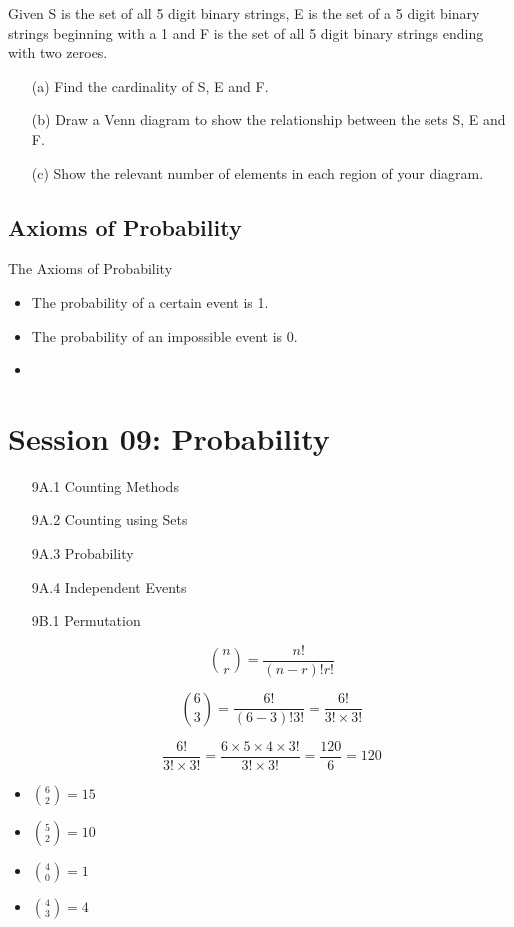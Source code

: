 \documentclass[]{report}
\begin{document}
Given S is the set of all 5 digit binary strings, E is the set of a 5 digit
binary strings beginning with a 1 and F is the set of all 5 digit binary strings ending
with two zeroes.
\begin{itemize}
	\item[(a)] Find the cardinality of S, E and F.
	\item[(b)] Draw a Venn diagram to show the relationship between the sets S, E and F.
	\item[(c)]Show the relevant number of elements in each region of your diagram.
\end{itemize}
\newpage




\subsection{Axioms of Probability}

The Axioms of Probability

\begin{itemize}
	\item The probability of a certain event is 1.
	\item The probability of an impossible event is 0.
	\item 
\end{itemize}
				\section*{Session 09: Probability}
				\begin{itemize}
					\item[9A.1] Counting Methods
					\item[9A.2] Counting using Sets
					\item[9A.3] Probability
					\item[9A.4] Independent Events
				\end{itemize}
				\begin{itemize}
					\item[9B.1] Permutation
					
					\[ {n \choose r} = \frac{n!}{(n-r)! r!} \]
					
					
					\[ {6 \choose 3} = \frac{6!}{(6-3)! 3!} = \frac{6!}{3! \times 3!}\]
					
					
					\[ \frac{6!}{3! \times 3!} = \frac{6 \times 5 \times 4 \times 3!}{3! \times 3!} = \frac{120}{6} = 120\]
				\end{itemize}
				\begin{itemize}
					\item ${6 \choose 2} = 15$
					\item ${5 \choose 2} = 10$  
					\item ${4 \choose 0} = 1$  
					\item ${4 \choose 3} = 4$  
				\end{itemize}
				
\end{document}
